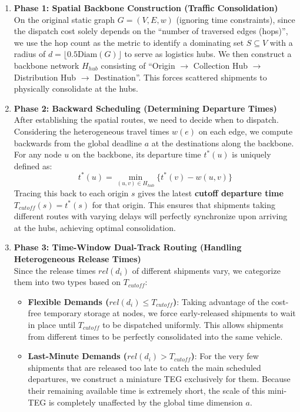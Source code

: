 \documentclass[12pt, a4paper]{article}
\begin{document}
\begin{enumerate}[noitemsep]
    \item \textbf{Phase 1: Spatial Backbone Construction (Traffic Consolidation)} \\
    On the original static graph $G=(V, E, w)$ (ignoring time constraints), since the dispatch cost solely depends on the ``number of traversed edges (hops)'', we use the hop count as the metric to identify a dominating set $S \subseteq V$ with a radius of $d = \lfloor 0.5 \text{Diam}(G) \rfloor$ to serve as logistics hubs. We then construct a backbone network $H_{hub}$ consisting of ``Origin $\to$ Collection Hub $\to$ Distribution Hub $\to$ Destination''. This forces scattered shipments to physically consolidate at the hubs.
    
    \item \textbf{Phase 2: Backward Scheduling (Determining Departure Times)} \\
    After establishing the spatial routes, we need to decide when to dispatch. Considering the heterogeneous travel times $w(e)$ on each edge, we compute backwards from the global deadline $a$ at the destinations along the backbone. For any node $u$ on the backbone, its departure time $t^*(u)$ is uniquely defined as:
    \begin{equation}
        t^*(u) = \min_{(u,v) \in H_{hub}} \big\{ t^*(v) - w(u,v) \big\}
    \end{equation}
    Tracing this back to each origin $s$ gives the latest \textbf{cutoff departure time $T_{cutoff}(s) = t^*(s)$} for that origin. This ensures that shipments taking different routes with varying delays will perfectly synchronize upon arriving at the hubs, achieving optimal consolidation.
    
    \item \textbf{Phase 3: Time-Window Dual-Track Routing (Handling Heterogeneous Release Times)} \\
    Since the release times $rel(d_i)$ of different shipments vary, we categorize them into two types based on $T_{cutoff}$:
    \begin{itemize}
        \item \textbf{Flexible Demands ($rel(d_i) \le T_{cutoff}$)}: Taking advantage of the cost-free temporary storage at nodes, we force early-released shipments to wait in place until $T_{cutoff}$ to be dispatched uniformly. This allows shipments from different times to be perfectly consolidated into the same vehicle.
        \item \textbf{Last-Minute Demands ($rel(d_i) > T_{cutoff}$)}: For the very few shipments that are released too late to catch the main scheduled departures, we construct a miniature TEG exclusively for them. Because their remaining available time is extremely short, the scale of this mini-TEG is completely unaffected by the global time dimension $a$.
    \end{itemize}
\end{enumerate}
\end{document}
